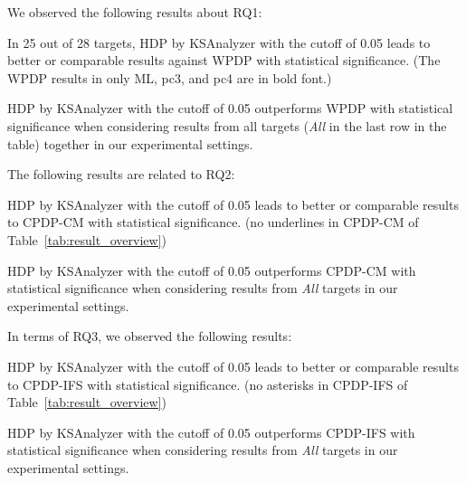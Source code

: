 We observed the following results about RQ1:
\squishlist
	\item In 25 out of 28 targets, HDP by KSAnalyzer with the cutoff of
	0.05 leads to better or comparable results against WPDP with statistical
	significance. (The WPDP results in only ML, pc3, and pc4 are in bold font.)
	\item HDP by KSAnalyzer with the cutoff of 0.05 outperforms
	WPDP with statistical significance when considering
	results from all targets ({\em All} in the last row in the table) together in
	our experimental settings.
\squishend  

The following results are related to RQ2:
\squishlist 	
	\item HDP by KSAnalyzer with the cutoff of 0.05
	leads to better or comparable results to CPDP-CM
	with statistical significance. (no underlines in CPDP-CM of
	Table~\ref{tab:result_overview})
	\item HDP by KSAnalyzer with the cutoff of 0.05 outperforms
	CPDP-CM with statistical significance
	when considering results from {\em All} targets in our experimental
	settings.
\squishend  

In terms of RQ3, we observed the following results:
\squishlist 	
	\item HDP by KSAnalyzer with the cutoff of 0.05
	leads to better or comparable results to CPDP-IFS with
	statistical significance. (no asterisks in CPDP-IFS of
	Table~\ref{tab:result_overview})
	\item HDP by KSAnalyzer with the cutoff of 0.05 outperforms
	CPDP-IFS with statistical significance
	when considering results from {\em All} targets in our experimental
	settings.
\squishend  
% 
% 
% 

